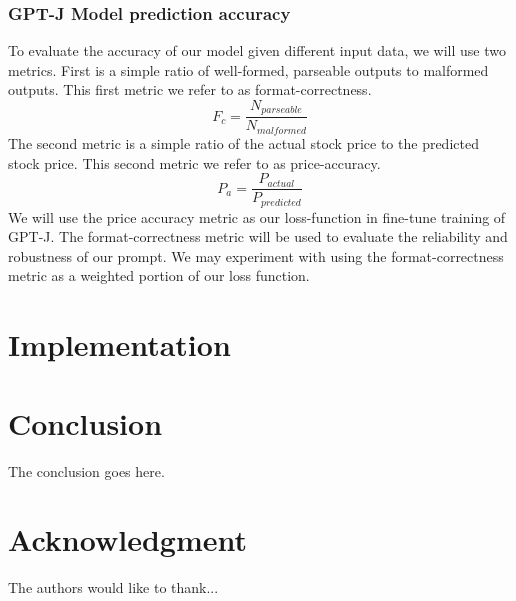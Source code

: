 \documentclass[conference]{IEEEtran}
\begin{document}
\subsubsection{GPT-J Model prediction accuracy}
To evaluate the accuracy of our model given different input data, we will use two metrics. First is a simple ratio of well-formed, parseable outputs to malformed outputs. This first metric we refer to as format-correctness. 
\begin{equation}
	F_c=\frac{N_{parseable}}{N_{malformed}}
\end{equation}
The second metric is a simple ratio of the actual stock price to the predicted stock price. This second metric we refer to as price-accuracy.
\begin{equation}
	P_a=\frac{P_{actual}}{P_{predicted}}
\end{equation}
We will use the price accuracy metric as our loss-function in fine-tune training of GPT-J. The format-correctness metric will be used to evaluate the reliability and robustness of our prompt. We may experiment with using the format-correctness metric as a weighted portion of our loss function.
\section{Implementation}
\section{Conclusion}
The conclusion goes here.

\section*{Acknowledgment}
The authors would like to thank... 




\end{document}

